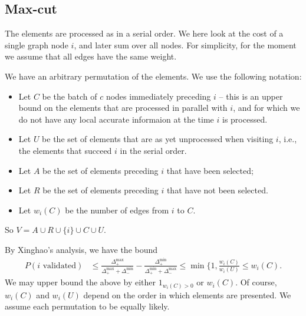 \documentclass{article}
\newcommand{\union}{\cup}
\newcommand{\Dpmi}{\Delta^{\min}_+}
\newcommand{\Dpma}{\Delta^{\max}_+}
\newcommand{\Dmmi}{\Delta^{\min}_-}
\newcommand{\Dmma}{\Delta^{\max}_-}
\begin{document}
\subsection*{Max-cut}

The elements are processed as in a serial order. We here look at the cost of a single graph node $i$, and later sum over all nodes. For simplicity, for the moment we assume that all edges have the same weight.

We have an arbitrary permutation of the elements. We use the following notation:

\begin{itemize}
\item Let $C$ be the batch of $c$ nodes immediately preceding $i$ -- this is an upper bound on the elements that are processed in parallel with $i$, and for which we do not have any local accurate informaion at the time $i$ is processed.
\item Let $U$ be the set of elements that are as yet unprocessed when visiting $i$, i.e., the elements that succeed $i$ in the serial order.
\item Let $A$ be the set of elements preceding $i$ that have been selected;
\item Let $R$ be the set of elements preceding $i$ that have not been selected.
\item Let $w_i(C)$ be the number of edges from $i$ to $C$.
\end{itemize}
So $V = A \union R \union \{i\} \union C \union U$.

By Xinghao's analysis, we have the bound
\begin{align}
  P(i \text{ validated}) &\leq \frac{\Dpma}{\Dpma + \Dmmi} - \frac{\Dpmi}{\Dpmi + \Dmma} \leq \min\{ 1, \frac{w_i(C)}{w_i(U)} \leq w_i(C).
\end{align}
We may upper bound the above by either $1_{w_i(C) > 0}$ or $w_i(C)$.
Of course, $w_i(C)$ and $w_i(U)$ depend on the order in which elements are presented. We assume each permutation to be equally likely.
\end{document}
